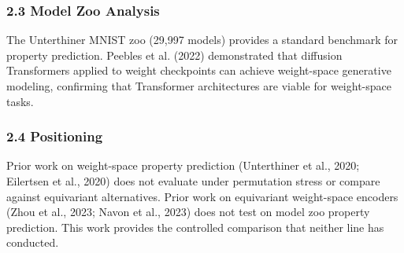 \subsubsection{2.3 Model Zoo Analysis}

The Unterthiner MNIST zoo (29,997 models) provides a standard benchmark for property prediction. Peebles et al. (2022) demonstrated that diffusion Transformers applied to weight checkpoints can achieve weight-space generative modeling, confirming that Transformer architectures are viable for weight-space tasks.

\subsubsection{2.4 Positioning}

Prior work on weight-space property prediction (Unterthiner et al., 2020; Eilertsen et al., 2020) does not evaluate under permutation stress or compare against equivariant alternatives. Prior work on equivariant weight-space encoders (Zhou et al., 2023; Navon et al., 2023) does not test on model zoo property prediction. This work provides the controlled comparison that neither line has conducted.
